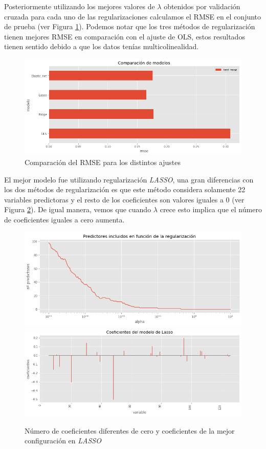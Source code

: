 \documentclass{article}
\begin{document}
Posteriormente utilizando los mejores valores de $\lambda$ obtenidos por validación cruzada para cada uno de las regularizaciones calculamos el RMSE en el conjunto de prueba (ver Figura \ref{fig:comparacion_errores_ejer1}). Podemos notar que los tres métodos de regularización tienen mejores RMSE en comparación con el ajuste de OLS, estos resultados tienen sentido debido a que los datos tenías multicolinealidad. 
\begin{figure}[H]
    \centering
    \includegraphics[scale=0.4]{figure/comparacion_errores_ejer1.png}
    \caption{Comparación del RMSE para los distintos ajustes}
    \label{fig:comparacion_errores_ejer1}
\end{figure}
El mejor modelo fue utilizando regularización \textit{LASSO}, una gran diferencias con los dos métodos de regularización es que este método considera solamente 22 variables predictoras y el resto de los coeficientes son valores iguales a 0 (ver Figura \ref{fig:coef_lasso_ejer1}). De igual manera, vemos que cuando $\lambda$ crece esto implica que el número de coeficientes iguales a cero aumenta. 
\begin{figure}[H]
    \centering
    \includegraphics[scale=0.3]{figure/cero_lasso_ejer1.png}
    \includegraphics[scale=0.3]{figure/lasso_ejer1.png}
    \caption{Número de coeficientes diferentes de cero y coeficientes de la mejor configuración en \textit{LASSO}}
    \label{fig:coef_lasso_ejer1}
\end{figure}
\end{document}
